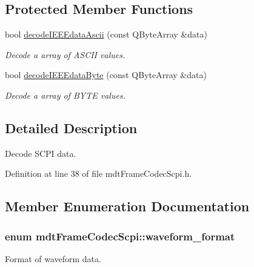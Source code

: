 \subsection*{Protected Member Functions}
\begin{DoxyCompactItemize}
\item 
bool \hyperlink{classmdt_frame_codec_scpi_aa6596dc898438be704191ad282d02100}{decodeIEEEdataAscii} (const QByteArray \&data)
\begin{DoxyCompactList}\small\item\em Decode a array of ASCII values. \end{DoxyCompactList}\item 
bool \hyperlink{classmdt_frame_codec_scpi_ab70c6c3d2d91ddff065952b6c2db8345}{decodeIEEEdataByte} (const QByteArray \&data)
\begin{DoxyCompactList}\small\item\em Decode a array of BYTE values. \end{DoxyCompactList}\end{DoxyCompactItemize}


\subsection{Detailed Description}
Decode SCPI data. 

Definition at line 38 of file mdtFrameCodecScpi.h.



\subsection{Member Enumeration Documentation}
\hypertarget{classmdt_frame_codec_scpi_a1aafb008a4207cc922f46fe905b3f17d}{
\subsubsection[{waveform\_\-format}]{\setlength{\rightskip}{0pt plus 5cm}enum {\bf mdtFrameCodecScpi::waveform\_\-format}}}
\label{classmdt_frame_codec_scpi_a1aafb008a4207cc922f46fe905b3f17d}


Format of waveform data. 

